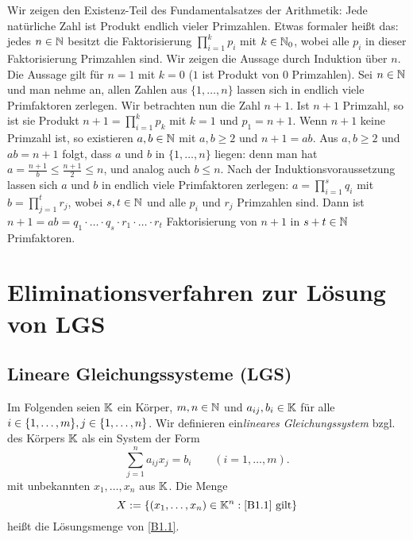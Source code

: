 \begin{bsp}
	Wir zeigen den Existenz-Teil des Fundamentalsatzes der Arithmetik: Jede natürliche Zahl ist Produkt endlich vieler Primzahlen.  Etwas formaler heißt das: jedes $n \in \mathbb N$ besitzt die Faktorisierung $\prod_{i=1}^k p_i$ mit $k \in \mathbb N_0$, wobei alle $p_i$ in dieser Faktorisierung Primzahlen sind. Wir zeigen die Aussage durch Induktion über $n$. Die Aussage gilt für $n=1$ mit $k=0$ ($1$ ist Produkt von $0$ Primzahlen). Sei $n \in \mathbb N$ und man nehme an, allen Zahlen aus $\{1,\ldots,n\}$ lassen sich in endlich viele Primfaktoren zerlegen. Wir betrachten nun die Zahl $n+1$. Ist $n+1$ Primzahl, so ist sie Produkt $n+ 1 = \prod_{i=1}^k p_k$ mit $k=1$ und $p_1=n+1$. Wenn $n+1$ keine Primzahl ist, so existieren $a, b \in \mathbb N$ mit $a, b \ge 2$ und $n+1 = ab$. Aus $a,b \ge 2$ und $ab = n+1$ folgt, dass $a$ und $b$ in $\{1,\ldots,n\}$ liegen: denn man hat $a = \frac{n+1}{b} \le \frac{n+1}{2} \le n$, und analog auch $b \le n$. Nach der Induktionsvoraussetzung lassen sich $a$ und $b$ in endlich viele Primfaktoren zerlegen: $a = \prod_{i=1}^s q_i$ mit $b = \prod_{j=1}^t r_j$, wobei $s, t\in \mathbb N$ und alle $p_i$ und $r_j$ Primzahlen sind. Dann ist $n+1 = ab = q_1 \cdot \ldots \cdot q_s \cdot r_1 \cdot \ldots \cdot r_t$ Faktorisierung von $n+1$ in $s+t \in \mathbb N$ Primfaktoren. 
\end{bsp} 

\section{Eliminationsverfahren zur Lösung von LGS}

\subsection{Lineare Gleichungssysteme (LGS)}

Im Folgenden seien $ \mathbb K $ ein Körper, $ m,n \in \mathbb N $ und $ a_{ij}, b_i \in \mathbb K $ für alle $ i \in \{ 1,\ldots,m \}, j \in \{ 1,\ldots,n \} $. Wir definieren ein\emph{lineares Gleichungssystem} bzgl. des Körpers $\mathbb K$ als ein System der Form
\begin{equation}
	\sum_{j=1}^{n} a_{ij} x_j = b_i \qquad  (i=1,\ldots,m). 
	\label{B1.1}
\end{equation}
mit unbekannten $ x_1, \ldots, x_n $ aus $ \mathbb K $. Die Menge
\begin{equation}
	X := \{(x_1, \ldots, x_n) \in \mathbb K^n : \text{\eqref{B1.1} gilt} \}
	\label{B1.2}
\end{equation}
heißt die Lösungsmenge von \eqref{B1.1}.

